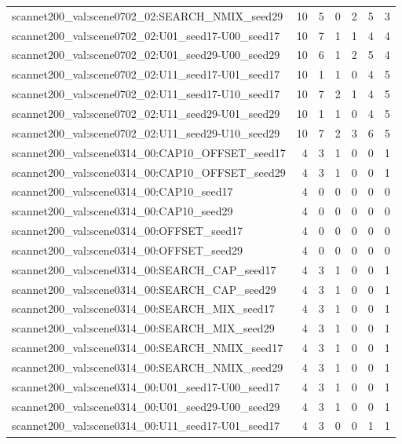 \begin{table}[t]
\begin{tabular}{lrrrrrr}
scannet200\_val:scene0702\_02:SEARCH\_NMIX\_seed29 & 10 & 5 & 0 & 2 & 5 & 3 \\
scannet200\_val:scene0702\_02:U01\_seed17-U00\_seed17 & 10 & 7 & 1 & 1 & 4 & 4 \\
scannet200\_val:scene0702\_02:U01\_seed29-U00\_seed29 & 10 & 6 & 1 & 2 & 5 & 4 \\
scannet200\_val:scene0702\_02:U11\_seed17-U01\_seed17 & 10 & 1 & 1 & 0 & 4 & 5 \\
scannet200\_val:scene0702\_02:U11\_seed17-U10\_seed17 & 10 & 7 & 2 & 1 & 4 & 5 \\
scannet200\_val:scene0702\_02:U11\_seed29-U01\_seed29 & 10 & 1 & 1 & 0 & 4 & 5 \\
scannet200\_val:scene0702\_02:U11\_seed29-U10\_seed29 & 10 & 7 & 2 & 3 & 6 & 5 \\
scannet200\_val:scene0314\_00:CAP10\_OFFSET\_seed17 & 4 & 3 & 1 & 0 & 0 & 1 \\
scannet200\_val:scene0314\_00:CAP10\_OFFSET\_seed29 & 4 & 3 & 1 & 0 & 0 & 1 \\
scannet200\_val:scene0314\_00:CAP10\_seed17 & 4 & 0 & 0 & 0 & 0 & 0 \\
scannet200\_val:scene0314\_00:CAP10\_seed29 & 4 & 0 & 0 & 0 & 0 & 0 \\
scannet200\_val:scene0314\_00:OFFSET\_seed17 & 4 & 0 & 0 & 0 & 0 & 0 \\
scannet200\_val:scene0314\_00:OFFSET\_seed29 & 4 & 0 & 0 & 0 & 0 & 0 \\
scannet200\_val:scene0314\_00:SEARCH\_CAP\_seed17 & 4 & 3 & 1 & 0 & 0 & 1 \\
scannet200\_val:scene0314\_00:SEARCH\_CAP\_seed29 & 4 & 3 & 1 & 0 & 0 & 1 \\
scannet200\_val:scene0314\_00:SEARCH\_MIX\_seed17 & 4 & 3 & 1 & 0 & 0 & 1 \\
scannet200\_val:scene0314\_00:SEARCH\_MIX\_seed29 & 4 & 3 & 1 & 0 & 0 & 1 \\
scannet200\_val:scene0314\_00:SEARCH\_NMIX\_seed17 & 4 & 3 & 1 & 0 & 0 & 1 \\
scannet200\_val:scene0314\_00:SEARCH\_NMIX\_seed29 & 4 & 3 & 1 & 0 & 0 & 1 \\
scannet200\_val:scene0314\_00:U01\_seed17-U00\_seed17 & 4 & 3 & 1 & 0 & 0 & 1 \\
scannet200\_val:scene0314\_00:U01\_seed29-U00\_seed29 & 4 & 3 & 1 & 0 & 0 & 1 \\
scannet200\_val:scene0314\_00:U11\_seed17-U01\_seed17 & 4 & 3 & 0 & 0 & 1 & 1 \\

\end{tabular}
\end{table}
